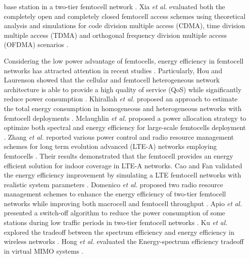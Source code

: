 \documentclass[10pt,final,journal,letterpaper,twoside,twocolumn]{IEEEtran}
\begin{document}
base station in a two-tier femtocell network \cite{Jo09}. Xia\textit{ et al.} evaluated both the completely open and completely closed
femtocell access schemes using theoretical analysis and simulations for code division multiple access (CDMA), time division multiple access (TDMA) and orthogonal frequency division multiple access (OFDMA) scenarios \cite{Xia10}.


Considering the low power advantage of femtocells, energy efficiency in
femtocell networks has attracted attention in recent studies \cite{Hou10,Khirallah11,Mclaughlin11,Zhang11,Cao10,Domenico11,Apio11,Ku13,Hong13}. Particularly, Hou
and Laurenson showed that the cellular and femtocell heterogeneous
network architecture is able to provide a high quality of service (QoS)
while significantly reduce power consumption \cite{Hou10}. Khirallah \textit{et
al.} proposed an approach to estimate the total energy consumption in homogeneous and
heterogeneous networks with femtocell deployments \cite{Khirallah11}. Mclaughlin \textit{et al.}
proposed a power allocation strategy to optimize both spectral and energy efficiency for large-scale femtocells deployment \cite{Mclaughlin11}. Zhang \textit{et al.} reported
various power control and radio resource management schemes for long term
evolution advanced (LTE-A) networks employing femtocells \cite{Zhang11}. Their results demonstrated
that the femtocell provides an energy efficient solution for indoor coverage in LTE-A
networks. Cao and Fan validated the energy efficiency improvement by simulating a LTE
femtocell networks with realistic system parameters \cite{Cao10}. Domenico \textit{et al.}
proposed two radio resource management schemes to enhance the energy
efficiency of two-tier femtocell networks while improving both macrocell and
femtocell throughput \cite{Domenico11}. Apio \textit{et al.} presented a switch-off
algorithm to reduce the power consumption of some stations during low traffic periods in
two-tier femtocell networks \cite{Apio11}. Ku \textit{et al.} explored the tradeoff between the spectrum efficiency and energy efficiency in wireless networks \cite{Ku13}. Hong \textit{et al.} evaluated the Energy-spectrum efficiency tradeoff in virtual MIMO systems \cite{Hong13}.
\end{document}
